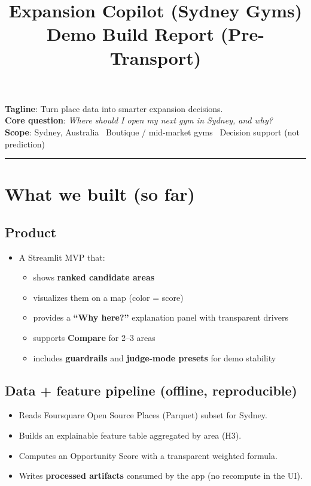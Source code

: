 \documentclass[11pt]{article}
\title{Expansion Copilot (Sydney Gyms)\\\large Demo Build Report (Pre-Transport)}
\author{}
\date{}
\begin{document}
\maketitle

\noindent\textbf{Tagline}: Turn place data into smarter expansion decisions.\\
\textbf{Core question}: \emph{Where should I open my next gym in Sydney, and why?}\\
\textbf{Scope}: Sydney, Australia \textbullet\ Boutique / mid-market gyms \textbullet\ Decision support (not prediction)

\bigskip
\hrule
\bigskip

\section{What we built (so far)}

\subsection{Product}
\begin{itemize}
  \item A Streamlit MVP that:
  \begin{itemize}
    \item shows \textbf{ranked candidate areas}
    \item visualizes them on a map (color = score)
    \item provides a \textbf{``Why here?''} explanation panel with transparent drivers
    \item supports \textbf{Compare} for 2--3 areas
    \item includes \textbf{guardrails} and \textbf{judge-mode presets} for demo stability
  \end{itemize}
\end{itemize}

\subsection{Data + feature pipeline (offline, reproducible)}
\begin{itemize}
  \item Reads Foursquare Open Source Places (Parquet) subset for Sydney.
  \item Builds an explainable feature table aggregated by area (H3).
  \item Computes an Opportunity Score with a transparent weighted formula.
  \item Writes \textbf{processed artifacts} consumed by the app (no recompute in the UI).
\end{itemize}
\end{document}
